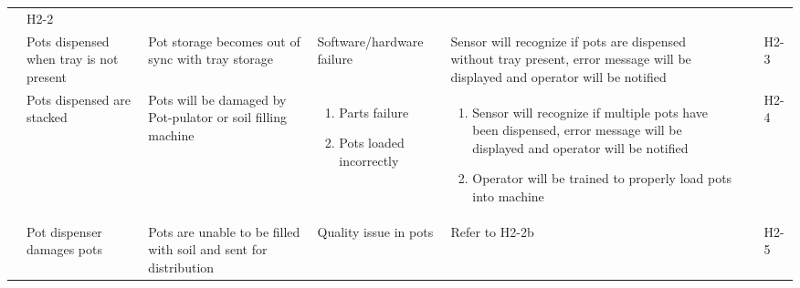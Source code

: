 \documentclass{article}
\begin{document}
\begin{landscape}
\begin{center}
\begin{longtable}{|l|  p{3cm}  p{4cm}  p{4cm}  p{4cm}  p{1cm}  p{1cm}|}
        &
        H2-2\\
        &
        Pots dispensed when tray is not present&
        Pot storage becomes out of sync with tray storage&
        Software/hardware failure&
        Sensor will recognize if pots are dispensed without tray present, error message will be displayed and operator will be notified&
        &
        H2-3\\

        &
        Pots dispensed are stacked&
        Pots will be damaged by Pot-pulator or soil filling machine&
        \begin{enumerate}[label=(\alph*)]
            \item Parts failure
            \item Pots loaded incorrectly
        \end{enumerate}&
        \begin{enumerate}[label=(\alph*)]
            \item Sensor will recognize if multiple pots have been dispensed, error message will be displayed and operator will be notified
            \item Operator will be trained to properly load pots into machine
        \end{enumerate}&\
        &
        H2-4\\

        &
        Pot dispenser damages pots&
        Pots are unable to be filled with soil and sent for distribution&
        Quality issue in pots&
        Refer to H2-2b&
        &
        H2-5\\

        \hline


\end{longtable}
\end{center}
\end{landscape}
\end{document}

